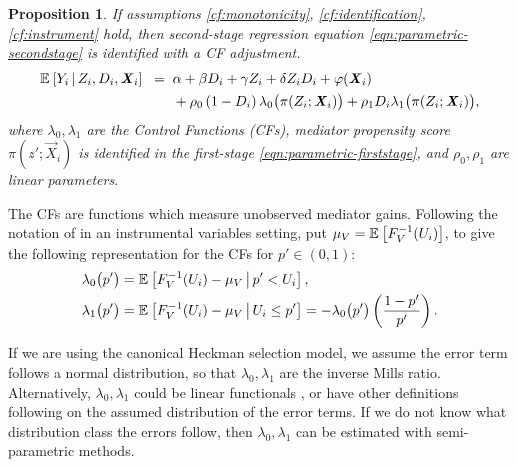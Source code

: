 \newtheorem{proposition}{Proposition}
\begin{proposition}
    \label{proposition:secondstage}
    If assumptions \ref{cf:monotonicity}, \ref{cf:identification}, \ref{cf:instrument} hold, then second-stage regression equation \eqref{eqn:parametric-secondstage} is identified with a CF adjustment.
    \begin{align*}
        \mathbb{E}_{} \left[ Y_i \, \middle\vert \, Z_i, D_i, \boldsymbol{\mathit{X}}_i \right] \;\; =& \;\;
            \alpha
            + \beta D_i
            + \gamma Z_i
            + \delta Z_i D_i
            + \varphi(\boldsymbol{\mathit{X}}_i) \\
            & \;\; +  \rho_0 \left( 1 - D_i \right) \lambda_0 \big( \pi(Z_i ; \boldsymbol{\mathit{X}}_i) \big)
                + \rho_1 D_i \lambda_1 \big( \pi(Z_i ; \boldsymbol{\mathit{X}}_i) \big),
    \end{align*}
    where $\lambda_0, \lambda_1$ are the Control Functions (CFs), mediator propensity score $\pi(z';\vec X_i)$ is identified in the first-stage \eqref{eqn:parametric-firststage}, and $\rho_0, \rho_1$ are linear parameters.
\end{proposition}
The CFs are functions which measure unobserved mediator gains.
Following the notation of \cite{kline2019heckits} in an instrumental variables setting, put $\mu_V = \mathbb{E}_{} \left[ F^{-1}_V(U_i) \right]$, to give the following representation for the CFs for $p' \in (0,1)$:
\begin{align*}
    \lambda_0\big(p'\big) &=
        \mathbb{E}_{} \left[  F^{-1}_V(U_i) - \mu_V \, \middle\vert \, p' < U_i \right], \\
    \lambda_1\big(p'\big) &=
        \mathbb{E}_{} \left[  F^{-1}_V(U_i) - \mu_V \, \middle\vert \, U_i \leq p' \right] = 
            -\lambda_0\big( p' \big) \left(\frac{1-p'}{p'}\right).
\end{align*}

If we are using the canonical Heckman selection model, we assume the error term follows a normal distribution, so that $\lambda_0, \lambda_1$ are the inverse Mills ratio.
Alternatively, $\lambda_0, \lambda_1$ could be linear functionals \citep{wooldridge2015control}, or have other definitions following on the assumed distribution of the error terms.
If we do not know what distribution class the errors follow, then $\lambda_0, \lambda_1$ can be estimated with semi-parametric methods.

